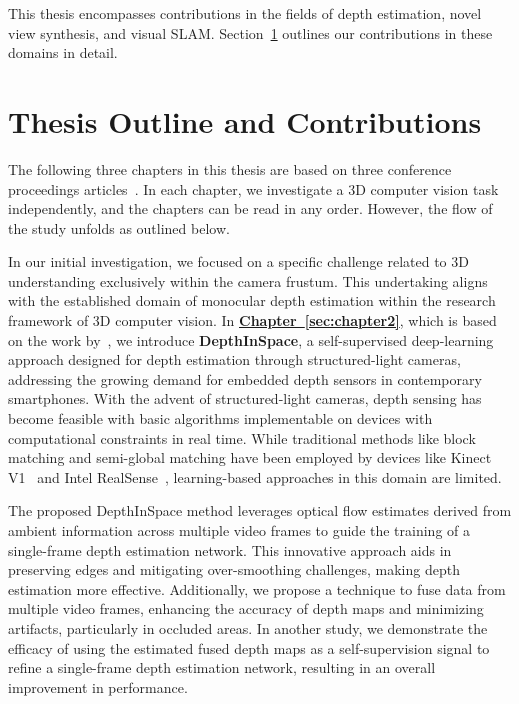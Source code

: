 This thesis encompasses contributions in the fields of depth estimation, novel view synthesis, and visual SLAM. Section~\ref{sec:c1_outline} outlines our contributions in these domains in detail.

\section{Thesis Outline and Contributions} \label{sec:c1_outline}

The following three chapters in this thesis are based on three conference proceedings articles~\citep{johari2021depthinspace,johari2022geonerf, johari2023eslam}. In each chapter, we investigate a 3D computer vision task independently, and the chapters can be read in any order. However, the flow of the study unfolds as outlined below.

In our initial investigation, we focused on a specific challenge related to 3D understanding exclusively within the camera frustum. This undertaking aligns with the established domain of monocular depth estimation within the research framework of 3D computer vision. In \textbf{\hyperref[sec:chapter2]{Chapter~\ref{sec:chapter2}}}, which is based on the work by~\cite{johari2021depthinspace}, we introduce \textbf{DepthInSpace}, a self-supervised deep-learning approach designed for depth estimation through structured-light cameras, addressing the growing demand for embedded depth sensors in contemporary smartphones. With the advent of structured-light cameras, depth sensing has become feasible with basic algorithms implementable on devices with computational constraints in real time. While traditional methods like block matching and semi-global matching have been employed by devices like Kinect V1~\citep{martinez2013kinect} and Intel RealSense~\citep{keselman2017intel}, learning-based approaches in this domain are limited.

The proposed DepthInSpace method leverages optical flow estimates derived from ambient information across multiple video frames to guide the training of a single-frame depth estimation network. This innovative approach aids in preserving edges and mitigating over-smoothing challenges, making depth estimation more effective. Additionally, we propose a technique to fuse data from multiple video frames, enhancing the accuracy of depth maps and minimizing artifacts, particularly in occluded areas. In another study, we demonstrate the efficacy of using the estimated fused depth maps as a self-supervision signal to refine a single-frame depth estimation network, resulting in an overall improvement in performance.


